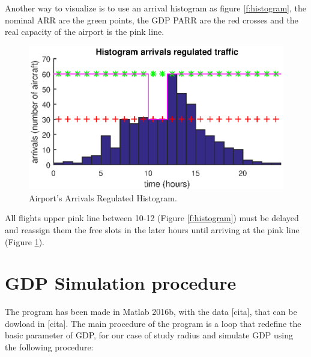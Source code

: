 \documentclass[final,1p]{elsarticle}
\begin{document}
Another way to visualize is to use an arrival histogram as figure \ref{f:histogram}, the nominal ARR are the green points, the GDP PARR are the red crosses and the real capacity of the airport is the pink line. 

 \begin{figure}[h]
 \centering
 \includegraphics[width=4.5in]{./figs/GDP.eps}
 \caption{Airport's Arrivals Regulated Histogram.}
 \label{f:GDP}
 \end{figure} 
 
 All flights upper pink line between 10-12 (Figure \ref{f:histogram}) must be delayed and reassign them the free slots in the later hours until arriving at the pink line (Figure \ref{f:GDP}).

\section{GDP Simulation procedure}
\label{Sec:Sect3}

The program has been made in Matlab 2016b, with the data [cita], that can be dowload in [cita]. The main procedure of the program is a loop that redefine the basic parameter of GDP, for our case of study radius and simulate GDP using the following procedure:
\end{document}
